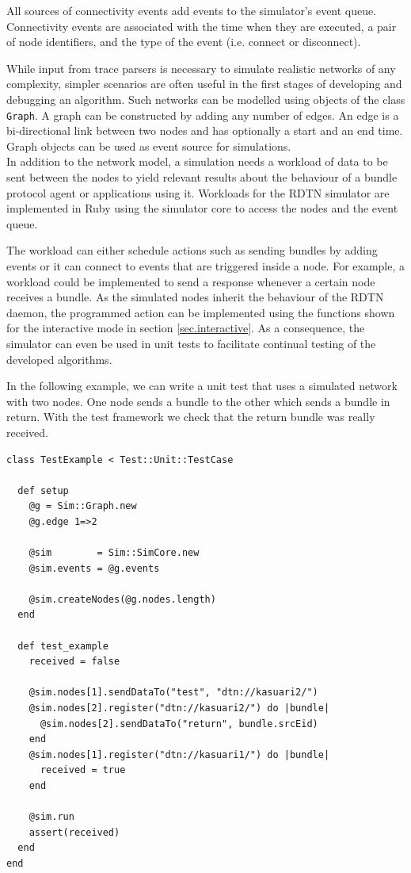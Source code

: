 \documentclass[a4paper]{article}
\begin{document}
All sources of connectivity events add events to the simulator's event queue.
Connectivity events are associated with the time when
they are executed, a pair of node identifiers, and the type of the event (i.e.
connect or disconnect).

While input from trace parsers is necessary to simulate realistic networks of
any complexity, simpler scenarios are often useful in the first stages of
developing and debugging an algorithm. Such networks can be modelled using
objects of the class {\tt Graph}. A graph can be constructed by adding any
number of edges. An edge is a bi-directional link between two nodes and has
optionally a start and an end time. Graph objects can be used as event source
for simulations.\\

In addition to the network model, a simulation needs a workload of data to be
sent between the nodes to yield relevant results about the behaviour of a bundle
protocol agent or applications using it. Workloads for the RDTN simulator are
implemented in Ruby using the simulator core to access the nodes and the event
queue. 

The workload can either schedule actions such as sending bundles by adding
events or it can connect to events that are triggered inside a node. For
example, a workload could be implemented to send a response whenever a certain
node receives a bundle. As the simulated nodes inherit the behaviour of the RDTN
daemon, the programmed action can be implemented using the functions shown for
the interactive mode in section \ref{sec.interactive}. As a consequence, the
simulator can even be used in unit tests to facilitate continual testing of the
developed algorithms.

In the following example, we can write a unit test that uses a simulated network
with two nodes. One node sends a bundle to the other which sends a bundle in
return. With the test framework we check that the return bundle was really
received.

\begin{verbatim}
class TestExample < Test::Unit::TestCase

  def setup
    @g = Sim::Graph.new
    @g.edge 1=>2

    @sim        = Sim::SimCore.new
    @sim.events = @g.events

    @sim.createNodes(@g.nodes.length)
  end

  def test_example
    received = false

    @sim.nodes[1].sendDataTo("test", "dtn://kasuari2/")
    @sim.nodes[2].register("dtn://kasuari2/") do |bundle|
      @sim.nodes[2].sendDataTo("return", bundle.srcEid)
    end
    @sim.nodes[1].register("dtn://kasuari1/") do |bundle|
      received = true
    end

    @sim.run
    assert(received)
  end
end
\end{verbatim}
\end{document}
